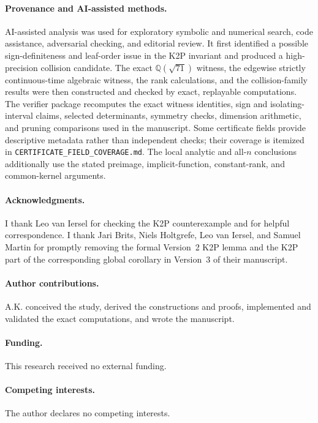 \documentclass[11pt]{article}
\theoremstyle{remark}\newtheorem{remark}[theorem]{Remark}
\begin{document}
\paragraph{Provenance and AI-assisted methods.}
AI-assisted analysis was used for exploratory symbolic and numerical search, code assistance, adversarial checking, and editorial review. It first identified a possible sign-definiteness and leaf-order issue in the K2P invariant and produced a high-precision collision candidate. The exact $\mathbb Q(\sqrt{71})$ witness, the edgewise strictly continuous-time algebraic witness, the rank calculations, and the collision-family results were then constructed and checked by exact, replayable computations. The verifier package recomputes the exact witness identities, sign and isolating-interval claims, selected determinants, symmetry checks, dimension arithmetic, and pruning comparisons used in the manuscript. Some certificate fields provide descriptive metadata rather than independent checks; their coverage is itemized in \texttt{CERTIFICATE\_FIELD\_COVERAGE.md}. The local analytic and all-$n$ conclusions additionally use the stated preimage, implicit-function, constant-rank, and common-kernel arguments.

\paragraph{Acknowledgments.}
I thank Leo van Iersel for checking the K2P counterexample and for helpful correspondence. I thank Jari Brits, Niels Holtgrefe, Leo van Iersel, and Samuel Martin for promptly removing the formal Version~2 K2P lemma and the K2P part of the corresponding global corollary in Version~3 of their manuscript.

\paragraph{Author contributions.}
A.K. conceived the study, derived the constructions and proofs, implemented and validated the exact computations, and wrote the manuscript.

\paragraph{Funding.}
This research received no external funding.

\paragraph{Competing interests.}
The author declares no competing interests.
\end{document}
